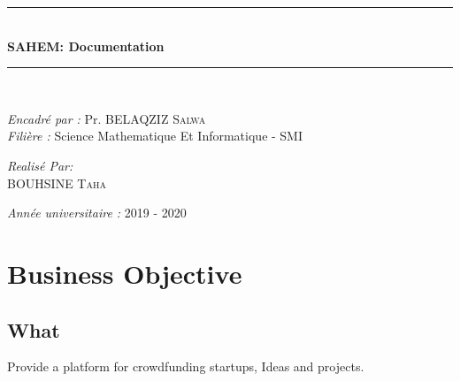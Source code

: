 \documentclass[11pt, openany]{report}
\newcommand{\HRule}{\rule{\linewidth}{0.5mm}}
\begin{document}
\begin{titlepage}
\begin{sffamily}
\begin{center}
    \HRule \\[0.4cm]
    { \huge \bfseries  SAHEM: Documentation \\[0.4cm] }

    \HRule \\[2cm]
    \begin{minipage}{0.6\textwidth}
      \begin{flushleft} \large
        \emph{Encadré par : } Pr. \textsc{BELAQZIZ Salwa}\\
        \emph{Filière : } Science Mathematique Et Informatique - SMI \\
        
      \end{flushleft}
    \end{minipage}
    \newline \vskip1.5cm
    \begin{minipage}{0.5\textwidth}
      \begin{center} \large
        \emph{Realisé Par:} \\
                            \textsc{BOUHSINE Taha}\\
                         
      \end{center}
    \end{minipage}
    \vskip1.5cm
    \vfill

    {\large \emph{Année universitaire : } 2019 - 2020}

  \end{center}
  \end{sffamily}
  \thispagestyle{empty}
\end{titlepage}


\clearpage





\renewcommand{\baselinestretch}{1.30}\small \normalsize

\tableofcontents
\listoffigures
\listoftables
\renewcommand{\baselinestretch}{1.18}\small \normalsize
\newpage
{}

\chapter{ Business Objective }
\section{What}
Provide a platform for crowdfunding startups, Ideas and projects.
\end{document}
